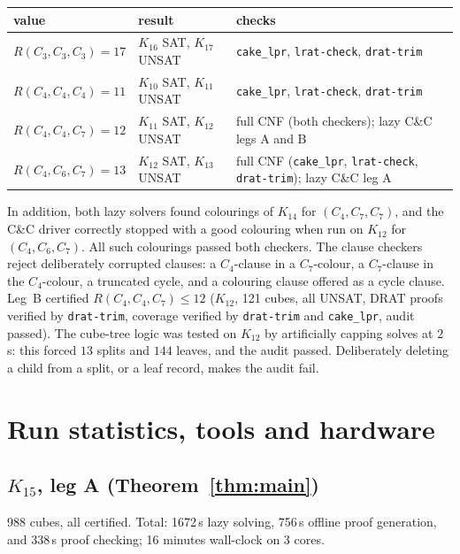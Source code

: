 \documentclass[11pt]{amsart}
\theoremstyle{definition}
\theoremstyle{remark}
\begin{document}
\begin{center}
\begin{tabular}{ll>{\raggedright\arraybackslash}p{6.2cm}}
\toprule
value & result & checks \\
\midrule
$R(C_3,C_3,C_3)=17$ \cite{Rad} & $K_{16}$ SAT, $K_{17}$ UNSAT & \texttt{cake\_lpr}, \texttt{lrat-check}, \texttt{drat-trim} \\
$R(C_4,C_4,C_4)=11$ \cite{Rad} & $K_{10}$ SAT, $K_{11}$ UNSAT & \texttt{cake\_lpr}, \texttt{lrat-check}, \texttt{drat-trim} \\
$R(C_4,C_4,C_7)=12$ \cite{SunYLZ2,Tse3} & $K_{11}$ SAT, $K_{12}$ UNSAT & full CNF (both checkers); lazy C\&C legs A and B \\
$R(C_4,C_6,C_7)=13$ \cite{SunYWLX,Tse3} & $K_{12}$ SAT, $K_{13}$ UNSAT & full CNF (\texttt{cake\_lpr}, \texttt{lrat-check}, \texttt{drat-trim}); lazy C\&C leg A \\
\bottomrule
\end{tabular}
\end{center}
\noindent In addition, both lazy solvers found colourings of $K_{14}$ for $(C_4,C_7,C_7)$, and the C\&C driver correctly stopped
with a good colouring when run on $K_{12}$ for $(C_4,C_6,C_7)$. All such colourings passed both checkers. The clause checkers reject
deliberately corrupted clauses: a $C_4$-clause in a $C_7$-colour, a $C_7$-clause in the $C_4$-colour, a truncated cycle, and a
colouring clause offered as a cycle clause. Leg~B certified $R(C_4,C_4,C_7)\le 12$ ($K_{12}$, 121 cubes, all UNSAT, DRAT proofs verified by
\texttt{drat-trim}, coverage verified by \texttt{drat-trim} and \texttt{cake\_lpr}, audit passed). The cube-tree logic was tested on
$K_{12}$ by artificially capping solves at $2$\,s: this forced $13$ splits and $144$ leaves, and the audit passed. Deliberately deleting a
child from a split, or a leaf record, makes the audit fail.

\section{Run statistics, tools and hardware}\label{app:stats}

\subsection*{$K_{15}$, leg A (Theorem~\ref{thm:main})}
988 cubes, all certified. Total: 1672\,s lazy solving, 756\,s offline proof generation, and 338\,s proof checking; 16 minutes
wall-clock on 3 cores.
\end{document}
